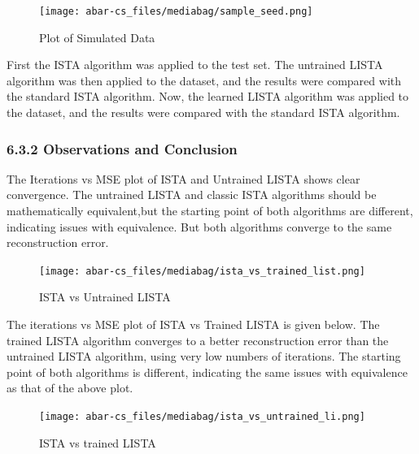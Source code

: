\documentclass[
  letterpaper,
  DIV=11,
  numbers=noendperiod]{scrartcl}
\begin{document}
\begin{figure}[H]

{\centering \texttt{[image: abar-cs\_files/mediabag/sample\_seed.png]}

}

\caption{Plot of Simulated Data}

\end{figure}%

First the ISTA algorithm was applied to the test set. The untrained
LISTA algorithm was then applied to the dataset, and the results were
compared with the standard ISTA algorithm. Now, the learned LISTA
algorithm was applied to the dataset, and the results were compared with
the standard ISTA algorithm.

\subsubsection{6.3.2 Observations and
Conclusion}\label{observations-and-conclusion}

The Iterations vs MSE plot of ISTA and Untrained LISTA shows clear
convergence. The untrained LISTA and classic ISTA algorithms should be
mathematically equivalent,but the starting point of both algorithms are
different, indicating issues with equivalence. But both algorithms
converge to the same reconstruction error.

\begin{figure}[H]

{\centering \texttt{[image: abar-cs\_files/mediabag/ista\_vs\_trained\_list.png]}

}

\caption{ISTA vs Untrained LISTA}

\end{figure}%

The iterations vs MSE plot of ISTA vs Trained LISTA is given below. The
trained LISTA algorithm converges to a better reconstruction error than
the untrained LISTA algorithm, using very low numbers of iterations. The
starting point of both algorithms is different, indicating the same
issues with equivalence as that of the above plot.

\begin{figure}[H]

{\centering \texttt{[image: abar-cs\_files/mediabag/ista\_vs\_untrained\_li.png]}

}

\caption{ISTA vs trained LISTA}

\end{figure}%
\end{document}
